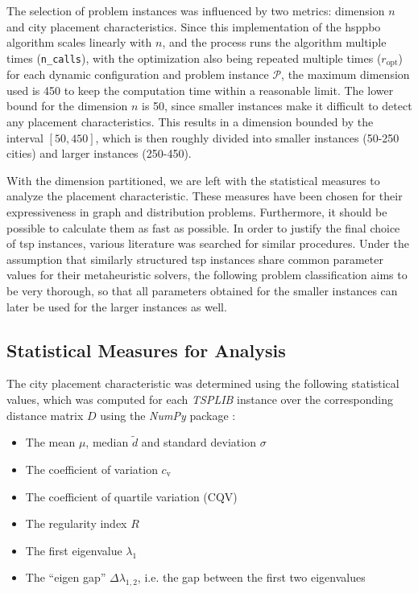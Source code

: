 The selection of problem instances was influenced by two metrics: dimension $n$ and city placement characteristics. Since this implementation of the \gls{hsppbo} algorithm scales linearly with $n$, and the  process runs the algorithm multiple times (\texttt{n\_calls}), with the optimization also being repeated multiple times ($r_\text{opt}$) for each dynamic configuration and problem instance $\mathcal{P}$, the maximum dimension used is 450 to keep the computation time within a reasonable limit. The lower bound for the dimension $n$ is 50, since smaller instances make it difficult to detect any placement characteristics. This results in a dimension bounded by the interval $[50,450]$, which is then roughly divided into smaller instances (50-250 cities) and larger instances (250-450).

With the dimension partitioned, we are left with the statistical measures to analyze the placement characteristic. These measures have been chosen for their expressiveness in graph and distribution problems. Furthermore, it should be possible to calculate them as fast as possible. In order to justify the final choice of \gls{tsp} instances, various literature was searched for similar procedures.
Under the assumption that similarly structured \gls{tsp} instances share common parameter values for their metaheuristic solvers, the following problem classification aims to be very thorough, so that all parameters obtained for the smaller instances can later be used for the larger instances as well.

\subsection{Statistical Measures for Analysis}
\label{chap:prob-stat-meas}

The city placement characteristic was determined using the following statistical values, which was computed for each \textit{TSPLIB} instance over the corresponding distance matrix $D$ using the \textit{NumPy} package \cite{harris2020array}:

\begin{itemize}
	\item The mean $\mu$, median $\tilde{d}$ and standard deviation $\sigma$
	\item The coefficient of variation $c_\text{v}$
	\item The coefficient of quartile variation (CQV)
	\item The regularity index $R$
	\item The first eigenvalue $\lambda_1$
	\item The \enquote{eigen gap} $\Delta\lambda_{1,2}$, i.e. the gap between the first two eigenvalues
\end{itemize}

